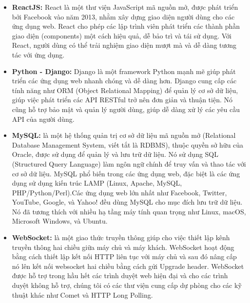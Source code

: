 \begin{itemize}
    \item \textbf{ReactJS:} React là một thư viện JavaScript mã nguồn mở, được phát triển bởi Facebook vào năm 2013, nhằm xây dựng giao diện người dùng cho các ứng dụng web. React cho phép các lập trình viên phát triển các thành phần giao diện (components) một cách hiệu quả, dễ bảo trì và tái sử dụng. Với React, người dùng có thể trải nghiệm giao diện mượt mà và dễ dàng tương tác với ứng dụng.
\end{itemize}

\begin{itemize}
    \item \textbf{Python - Django:} Django là một framework Python mạnh mẽ giúp phát triển các ứng dụng web nhanh chóng và dễ dàng hơn. Django cung cấp các tính năng như ORM (Object Relational Mapping) để quản lý cơ sở dữ liệu, giúp việc phát triển các API RESTful trở nên đơn giản và thuận tiện. Nó cũng hỗ trợ bảo mật và quản lý người dùng, giúp dễ dàng xử lý các yêu cầu API của người dùng.
\end{itemize}

\begin{itemize}
    \item \textbf{MySQL:} là một hệ thống quản trị cơ sở dữ liệu mã nguồn mở (Relational Database Management System, viết tắt là RDBMS), thuộc quyền sở hữu của Oracle, được sử dụng để quản lý và lưu trữ dữ liệu. Nó sử dụng SQL (Structured Query Language) làm ngôn ngữ chính để truy vấn và thao tác với cơ sở dữ liệu. MySQL phổ biến trong các ứng dụng web, đặc biệt là các ứng dụng sử dụng kiến trúc LAMP (Linux, Apache, MySQL, PHP/Python/Perl).Các ứng dụng web lớn nhất như Facebook, Twitter, YouTube, Google, và Yahoo! đều dùng MySQL cho mục đích lưu trữ dữ liệu. Nó đã tương thích với nhiều hạ tầng máy tính quan trọng như Linux, macOS, Microsoft Windows, và Ubuntu.
\end{itemize}

\begin{itemize}
    \item \textbf{WebSocket:} là một giao thức truyền thông giúp cho việc thiết lập kênh truyền thông hai chiều giữa máy chủ và máy khách. WebSocket hoạt động bằng cách thiết lập kết nối HTTP liên tục với máy chủ và sau đó nâng cấp nó lên kết nối websocket hai chiều bằng cách gửi Upgrade header. WebSocket được hỗ trợ trong hầu hết các trình duyệt web hiện đại và cho các trình duyệt không hỗ trợ, chúng tôi có các thư viện cung cấp dự phòng cho các kỹ thuật khác như Comet và HTTP Long Polling.
\end{itemize}

